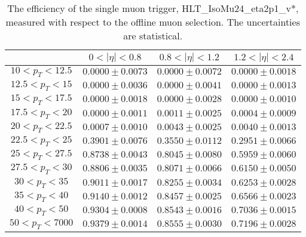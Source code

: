 \begin{table}[!ht]
\begin{center}
\begin{tabular}{c|c|c|c}
\hline & $0 < |\eta| < 0.8$ & $0.8 < |\eta| < 1.2$ & $1.2 < |\eta| < 2.4$  \\
\hline
$ 10 < p_T < 12.5$ & $0.0000 \pm 0.0073$ & $0.0000 \pm 0.0072$ & $0.0000 \pm 0.0018$  \\
$12.5 < p_T <  15$ & $0.0000 \pm 0.0036$ & $0.0000 \pm 0.0041$ & $0.0000 \pm 0.0013$  \\
$ 15 < p_T < 17.5$ & $0.0000 \pm 0.0018$ & $0.0000 \pm 0.0028$ & $0.0000 \pm 0.0010$  \\
$17.5 < p_T <  20$ & $0.0000 \pm 0.0011$ & $0.0011 \pm 0.0025$ & $0.0004 \pm 0.0009$  \\
$ 20 < p_T < 22.5$ & $0.0007 \pm 0.0010$ & $0.0043 \pm 0.0025$ & $0.0040 \pm 0.0013$  \\
$22.5 < p_T <  25$ & $0.3901 \pm 0.0076$ & $0.3550 \pm 0.0112$ & $0.2951 \pm 0.0066$  \\
$ 25 < p_T < 27.5$ & $0.8738 \pm 0.0043$ & $0.8045 \pm 0.0080$ & $0.5959 \pm 0.0060$  \\
$27.5 < p_T <  30$ & $0.8806 \pm 0.0035$ & $0.8071 \pm 0.0066$ & $0.6150 \pm 0.0050$  \\
$ 30 < p_T <  35$ & $0.9011 \pm 0.0017$ & $0.8255 \pm 0.0034$ & $0.6253 \pm 0.0028$  \\
$ 35 < p_T <  40$ & $0.9140 \pm 0.0012$ & $0.8457 \pm 0.0025$ & $0.6566 \pm 0.0023$  \\
$ 40 < p_T <  50$ & $0.9304 \pm 0.0008$ & $0.8543 \pm 0.0016$ & $0.7036 \pm 0.0015$  \\
$ 50 < p_T < 7000$ & $0.9379 \pm 0.0014$ & $0.8555 \pm 0.0030$ & $0.7196 \pm 0.0028$  \\
\hline
\end{tabular}
\caption{The efficiency of the single muon trigger,
HLT\_IsoMu24\_eta2p1\_v*,
measured with respect to the offline muon selection. 
The uncertainties are statistical.}
\label{tab:eff_muon_sgl}
\end{center}
\end{table}


